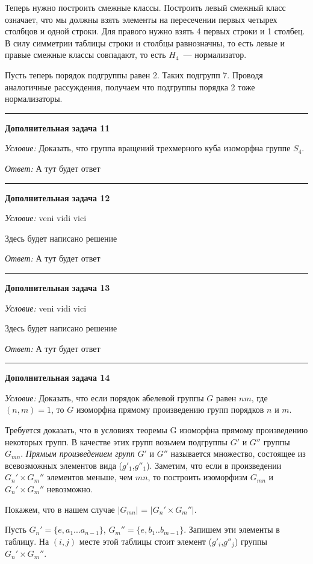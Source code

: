 \documentclass[12pt,a4paper]{article}
\newcommand{\sbs}{\large \bfseries}
\newcommand{\rl}{\vspace{16pt} \hrule \vspace{8pt}}
\begin{document}
Теперь нужно построить смежные классы. Построить левый смежный класс означает, что мы должны взять элементы на пересечении первых четырех столбцов и одной строки. Для правого нужно взять 4 первых строки и 1 столбец. В силу симметрии таблицы строки и столбцы равнозначны, то есть левые и правые смежные классы совпадают, то есть $H_4$~--- нормализатор.\null

Пусть теперь порядок подгруппы равен 2. Таких подгрупп 7. Проводя аналогичные рассуждения, получаем что подгруппы порядка 2 тоже нормализаторы.




\rl
{\sbs Дополнительная задача 11}

{\itshape Условие: } Доказать, что группа вращений трехмерного куба изоморфна группе $S_4$.

{\itshape Ответ: } А тут будет ответ




\rl
{\sbs Дополнительная задача 12}

{\itshape Условие: } veni vidi vici

Здесь будет написано решение

{\itshape Ответ: } А тут будет ответ




\rl
{\sbs Дополнительная задача 13}

{\itshape Условие: } veni vidi vici

Здесь будет написано решение

{\itshape Ответ: } А тут будет ответ




\rl
{\sbs Дополнительная задача 14}

{\itshape Условие: } Доказать, что если порядок абелевой группы $G$ равен $nm$, где $(n,m) = 1$, то $G$ изоморфна прямому произведению групп порядков $n$ и $m$.

Требуется доказать, что в условиях теоремы G изоморфна прямому произведению некоторых групп. В качестве этих групп возьмем подгруппы  $G'$ и $G''$ группы $G_{mn}$.
\textit{Прямым произведением групп} $G'$ и $G''$ называется множество, состоящее из всевозможных элементов вида ($g'_1$,$g''_1$). Заметим, что если в произведении $G_n' \times G_m'' $ элементов меньше, чем $mn$, то построить изоморфизм $G_{mn}$ и $G_n' \times G_m'' $ невозможно.

Покажем, что в нашем случае $|G_{mn}|$ = $|G_n' \times G_m''| $.

Пусть $G_n' = \lbrace e, a_1 ... a_{n-1} \rbrace$, $G_m'' = \lbrace e, b_1 .. b_{m-1}\rbrace.$ Запишем эти элементы в таблицу. На $(i,j)$ месте этой таблицы стоит элемент ($g'_i$,$g''_j$) группы $G_n' \times G_m''$.
\end{document}
